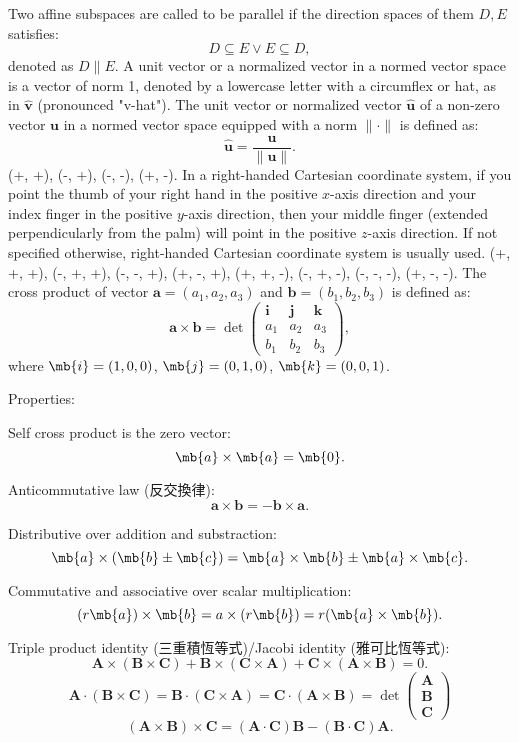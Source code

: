 \documentclass[a4paper,12pt]{report}
\begin{document}
Two affine subspaces are called to be parallel if the direction spaces of them $D,E$ satisfies:
\[D\subseteq E\lor E\subseteq D,\]
denoted as $D\parallel E$.
A unit vector or a normalized vector in a normed vector space is a vector of norm 1, denoted by a lowercase letter with a circumflex or hat, as in $\hat{\mathbf{v}}$ (pronounced "v-hat"). The unit vector or normalized vector $\hat{\mathbf{u}}$ of a non-zero vector $\mathbf{u}$ in a normed vector space equipped with a norm $\|\cdot\|$ is defined as:
\[\hat{\mathbf{u}}=\frac{\mathbf{u}}{\|\mathbf{u}\|}.\]
(+, +), (-, +), (-, -), (+, -).
In a right-handed Cartesian coordinate system, if you point the thumb of your right hand in the positive $x$-axis direction and your index finger in the positive $y$-axis direction, then your middle finger (extended perpendicularly from the palm) will point in the positive $z$-axis direction. If not specified otherwise, right-handed Cartesian coordinate system is usually used.
(+, +, +), (-, +, +), (-, -, +), (+, -, +), (+, +, -), (-, +, -), (-, -, -), (+, -, -).
The cross product of vector $\mathbf{a}=(a_1,a_2,a_3)$ and $\mathbf{b}=(b_1,b_2,b_3)$ is defined as:
\[\mathbf{a}\times\mathbf{b}=\det\begin{pmatrix}\mathbf{i} & \mathbf{j} & \mathbf{k}\\a_1 & a_2 & a_3\\b_1 & b_2 & b_3\end{pmatrix},\]
where $\mb{i}=(1,0,0)$, $\mb{j}=(0,1,0)$, $\mb{k}=(0,0,1)$.

Properties:
\bit
\item Self cross product is the zero vector:
\[\mb{a}\times\mb{a}=\mb{0}.\]
\item Anticommutative law (反交換律):
\[\mathbf{a}\times\mathbf{b}=-\mathbf{b}\times\mathbf{a}.\]
\item Distributive over addition and substraction:
\[\mb{a}\times(\mb{b}\pm\mb{c})=\mb{a}\times\mb{b}\pm\mb{a}\times\mb{c}.\]
\item Commutative and associative over scalar multiplication:
\[(r\mb{a})\times\mb{b}=a\times(r\mb{b})=r(\mb{a}\times\mb{b}).\]
\item Triple product identity (三重積恆等式)/Jacobi identity (雅可比恆等式):
\[\mathbf{A}\times(\mathbf{B}\times\mathbf{C})+\mathbf{B}\times(\mathbf{C}\times\mathbf{A})+\mathbf{C}\times(\mathbf{A}\times\mathbf{B})=0.\]
\[\mathbf{A}\cdot(\mathbf{B}\times\mathbf{C})=\mathbf{B}\cdot(\mathbf{C}\times\mathbf{A})=\mathbf{C}\cdot(\mathbf{A}\times\mathbf{B})=\det\begin{pmatrix}\mathbf{A}\\\mathbf{B}\\\mathbf{C}\end{pmatrix}\]
\[(\mathbf{A}\times\mathbf{B})\times\mathbf{C}=(\mathbf{A}\cdot\mathbf{C})\mathbf{B}-(\mathbf{B}\cdot\mathbf{C})\mathbf{A}.\]
\eit
\end{document}
